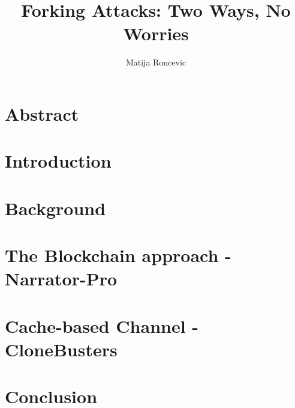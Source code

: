 \documentclass[sigconf]{acmart}
\title{Forking Attacks: Two Ways, No Worries}
\author{Matija Roncevic}
\affiliation{
    \institution{Friedricht-Alexander-Universität Erlangen-Nürnberg}
    \country{}
    \city{}}
\begin{document}
\maketitle  %




\section{Abstract}


\section{Introduction}


\section{Background}


\section{The Blockchain approach - Narrator-Pro}


\section{Cache-based Channel - CloneBusters}


\section{Conclusion}



\end{document}
